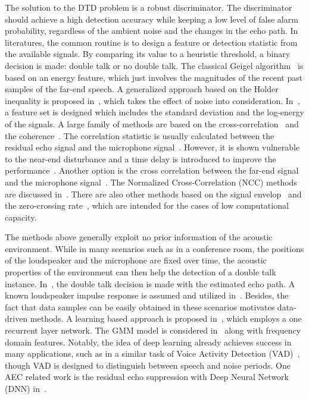 \documentclass[a4paper]{article}
\begin{document}
The solution to the DTD problem is a robust discriminator. The discriminator should achieve a high detection accuracy while keeping a low level of false alarm probability, regardless of the ambient noise and the changes in the echo path. In literatures, the common routine is to design a feature or detection statistic from the available signals. By comparing its value to a heuristic threshold, a binary decision is made: double talk or no double talk. The classical Geigel algorithm~\cite{duttweiler1978twelve} is based on an energy feature, which just involves the magnitudes of the recent past samples of the far-end speech. A generalized approach based on the Holder inequality is proposed in~\cite{paleologu2011class}, which takes the effect of noise into consideration. In~\cite{hamidia2014double}, a feature set is designed which includes the standard deviation and the log-energy of the signals. A large family of methods are based on the cross-correlation~\cite{ye1991new,schuldt2012delay,cho1999objective,benesty2000new,iqbal2007normalized} and the coherence~\cite{gansler1996double,tashev2012coherence}. The correlation statistic is usually calculated between the residual echo signal and the microphone signal~\cite{ye1991new}. However, it is shown vulnerable to the near-end disturbance and a time delay is introduced to improve the performance~\cite{schuldt2012delay}. Another option is the cross correlation between the far-end signal and the microphone signal~\cite{cho1999objective}. The Normalized Cross-Correlation (NCC) methods are discussed in~\cite{benesty2000new,iqbal2007normalized}. There are also other methods based on the signal envelop~\cite{szwoch2008low} and the zero-crossing rate~\cite{ikram2015double}, which are intended for the cases of low computational capacity.

The methods above generally exploit no prior information of the acoustic environment. While in many scenarios such as in a conference room, the positions of the loudspeaker and the microphone are fixed over time, the acoustic properties of the environment can then help the detection of a double talk instance. In~\cite{jung2005new}, the double talk decision is made with the estimated echo path. A known loudspeaker impulse response is assumed and utilized in~\cite{ahgren2005acoustic}. Besides, the fact that data samples can be easily obtained in these scenarios motivates data-driven methods. A learning based approach is proposed in~\cite{iqbal2006doubletalk}, which employs a one recurrent layer network. The GMM model is considered in~\cite{lee2010frequency} along with frequency domain features. Notably, the idea of deep learning already achieves success in many applications, such as in a similar task of Voice Activity Detection (VAD)~\cite{zhang2013deep,wang2015universal}, though VAD is designed to distinguish between speech and noise periods. One AEC related work is the residual echo suppression with Deep Neural Network (DNN) in~\cite{lee2015dnn}.
\end{document}
